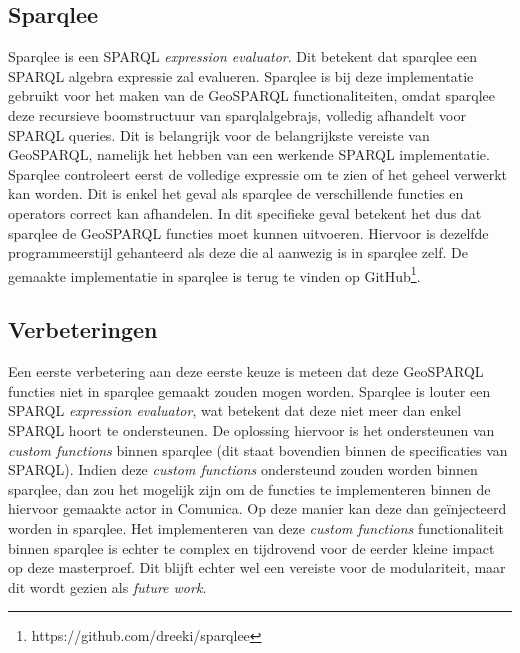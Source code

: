 \subsection{Sparqlee}
Sparqlee is een SPARQL \textit{expression evaluator}. Dit betekent dat sparqlee een SPARQL algebra expressie zal evalueren. Sparqlee is bij deze implementatie gebruikt voor het maken van de GeoSPARQL functionaliteiten, omdat sparqlee deze recursieve boomstructuur van sparqlalgebrajs, volledig afhandelt voor SPARQL queries. Dit is belangrijk voor de belangrijkste vereiste van GeoSPARQL, namelijk het hebben van een werkende SPARQL implementatie. Sparqlee controleert eerst de volledige expressie om te zien of het geheel verwerkt kan worden. Dit is enkel het geval als sparqlee de verschillende functies en operators correct kan afhandelen. In dit specifieke geval betekent het dus dat sparqlee de GeoSPARQL functies moet kunnen uitvoeren. Hiervoor is dezelfde programmeerstijl gehanteerd als deze die al aanwezig is in sparqlee zelf. De gemaakte implementatie in sparqlee is terug te vinden op GitHub\footnote{https://github.com/dreeki/sparqlee}.

\subsection{Verbeteringen}
Een eerste verbetering aan deze eerste keuze is meteen dat deze GeoSPARQL functies niet in sparqlee gemaakt zouden mogen worden. Sparqlee is louter een SPARQL \textit{expression evaluator}, wat betekent dat deze niet meer dan enkel SPARQL hoort te ondersteunen. De oplossing hiervoor is het ondersteunen van \textit{custom functions} binnen sparqlee (dit staat bovendien binnen de specificaties van SPARQL). Indien deze \textit{custom functions} ondersteund zouden worden binnen sparqlee, dan zou het mogelijk zijn om de functies te implementeren binnen de hiervoor gemaakte actor in Comunica. Op deze manier kan deze dan geïnjecteerd worden in sparqlee. Het implementeren van deze \textit{custom functions} functionaliteit binnen sparqlee is echter te complex en tijdrovend voor de eerder kleine impact op deze masterproef. Dit blijft echter wel een vereiste voor de modulariteit, maar dit wordt gezien als \textit{future work}.